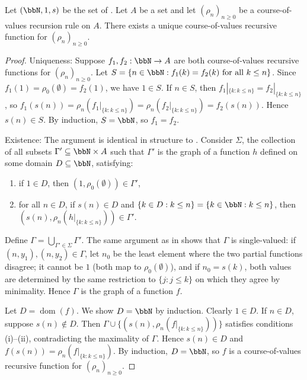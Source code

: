 \begin{proposition} \label{proposition:course_of_values_recursion_existence_uniqueness}
Let $(\bbN, 1, s)$ be the set of . Let $A$ be a set and let $(\rho_n)_{n \geq 0}$ be a course-of-values recursion rule on $A$. There exists a unique course-of-values recursive function for $(\rho_n)_{n \geq 0}$.
\end{proposition}

\begin{proof}
Uniqueness: Suppose $f_1, f_2: \bbN \to A$ are both course-of-values recursive functions for $(\rho_n)_{n \geq 0}$. Let $S = \{n \in \bbN : f_1(k) = f_2(k) \text{ for all } k \leq n\}$. Since $f_1(1) = \rho_0(\emptyset) = f_2(1)$, we have $1 \in S$. If $n \in S$, then $f_1|_{\{k : k \leq n\}} = f_2|_{\{k : k \leq n\}}$, so $f_1(s(n)) = \rho_n(f_1|_{\{k : k \leq n\}}) = \rho_n(f_2|_{\{k : k \leq n\}}) = f_2(s(n))$. Hence $s(n) \in S$. By induction, $S = \bbN$, so $f_1 = f_2$.

Existence: The argument is identical in structure to . Consider $\Sigma$, the collection of all subsets $\Gamma' \subseteq \bbN \times A$ such that $\Gamma'$ is the graph of a function $h$ defined on some domain $D \subseteq \bbN$, satisfying:
\begin{enumerate}
    \item if $1 \in D$, then $(1, \rho_0(\emptyset)) \in \Gamma'$,
    \item for all $n \in D$, if $s(n) \in D$ and $\{k \in D : k \leq n\} = \{k \in \bbN : k \leq n\}$, then $(s(n), \rho_n(h|_{\{k : k \leq n\}})) \in \Gamma'$.
\end{enumerate}
Define $\Gamma = \bigcup_{\Gamma' \in \Sigma} \Gamma'$. The same argument as in  shows that $\Gamma$ is single-valued: if $(n, y_1), (n, y_2) \in \Gamma$, let $n_0$ be the least element where the two partial functions disagree; it cannot be $1$ (both map to $\rho_0(\emptyset)$), and if $n_0 = s(k)$, both values are determined by the same restriction to $\{j : j \leq k\}$ on which they agree by minimality. Hence $\Gamma$ is the graph of a function $f$.

Let $D = \operatorname{dom}(f)$. We show $D = \bbN$ by induction. Clearly $1 \in D$. If $n \in D$, suppose $s(n) \notin D$. Then $\Gamma \cup \{(s(n), \rho_n(f|_{\{k : k \leq n\}}))\}$ satisfies conditions (i)--(ii), contradicting the maximality of $\Gamma$. Hence $s(n) \in D$ and $f(s(n)) = \rho_n(f|_{\{k : k \leq n\}})$. By induction, $D = \bbN$, so $f$ is a course-of-values recursive function for $(\rho_n)_{n \geq 0}$.
\end{proof}

